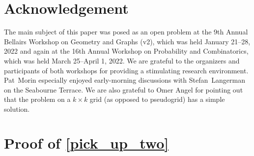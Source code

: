 \documentclass{patmorin}
\begin{document}
\section*{Acknowledgement}

The main subject of this paper was posed as an open problem at the 9th Annual Bellairs Workshop on Geometry and Graphs (v2), which was held January 21--28, 2022 and again at the 16th Annual Workshop on Probability and Combinatorics, which was held March 25--April 1, 2022. We are grateful to the organizers and participants of both workshops for providing a stimulating research environment.
Pat~Morin especially enjoyed early-morning discussions with Stefan~Langerman on the Seabourne Terrace. We are also grateful to Omer Angel for pointing out that the problem on a $k\times k$ grid (as opposed to pseudogrid) has a simple solution.






\appendix
\section{Proof of \cref{pick_up_two}}
\label{pick_up_two_proof}
\end{document}
